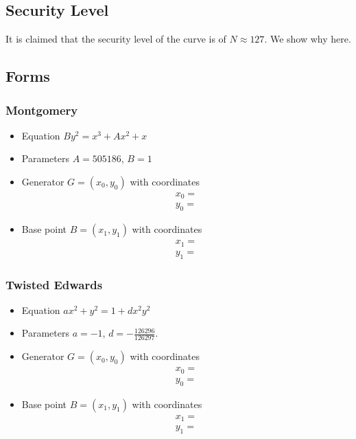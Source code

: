 \documentclass{article}
\theoremstyle{definition}
\theoremstyle{remark}
\begin{document}
	\subsection{Security Level}
	It is claimed that the security level of the curve is of $N\approx 127$. We show why here. 
	
	
	\subsection{Forms}
	
	\subsubsection{Montgomery}
	\begin{itemize}
		\item Equation $B y^2 = x^3 + A x^2 + x$
		\item Parameters $A = 505186$, $B = 1$
		\item Generator $G = (x_0, y_0)$ with coordinates
		\begin{align*}
			x_0 =  \\
			y_0 = 
		\end{align*}
		\item Base point $B = (x_1, y_1)$ with coordinates
		\begin{align*}
			x_1 = \\
			y_1 = 
		\end{align*}
	\end{itemize}
	
	\subsubsection{Twisted Edwards}
	\begin{itemize}
		\item Equation $a x^2 + y^2 = 1 + d x^2 y^2$
		\item Parameters $a = -1$, $d= -\frac{126296}{126297}$. %
		\item Generator $G = (x_0, y_0)$ with coordinates
		\begin{align*}
			x_0 = \\
			y_0 = 
		\end{align*}
		\item Base point $B = (x_1, y_1)$ with coordinates
		\begin{align*}
			x_1 = \\
			y_1 = 	
		\end{align*}
	\end{itemize}
	
\end{document}
